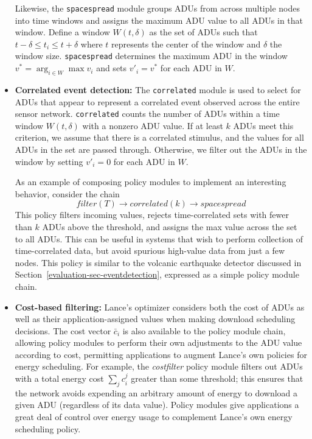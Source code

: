 \begin{itemize}
\hspace{0.25in}
Likewise, the \texttt{spacespread} module groups ADUs from across multiple
nodes into time windows and assigns the maximum ADU value to all ADUs in that
window. Define a window $W(t,\delta)$ as the set of ADUs such that $t-\delta
\leq t_i \leq t+\delta$ where $t$ represents the center of the window and
$\delta$ the window size. \texttt{spacespread} determines the maximum ADU in
the window $v^* = \arg_{i \in W} \max v_i$ and sets $v'_i = v^{*}$ for each
ADU in $W$.

\item \textbf{Correlated event detection:} The \texttt{correlated} module is
used to select for ADUs that appear to represent a correlated event observed
across the entire sensor network. \texttt{correlated} counts the number of
ADUs within a time window $W(t,\delta)$ with a nonzero ADU value. If at least
$k$ ADUs meet this criterion, we assume that there is a correlated stimulus,
and the values for all ADUs in the set are passed through. Otherwise, we
filter out the ADUs in the window by setting $v'_i = 0$ for each ADU in $W$.

\hspace{0.25in} As an example of composing policy modules to implement an
interesting behavior, consider the chain \[
\mathit{filter}(T)\rightarrow\mathit{correlated}(k)\rightarrow\mathit{spacespread}
\] This policy filters incoming values, rejects time-correlated sets with
fewer than $k$ ADUs above the threshold, and assigns the max value across the
set to all ADUs. This can be useful in systems that wish to perform
collection of time-correlated data, but avoid spurious high-value data from
just a few nodes. This policy is similar to the volcanic earthquake detector
discussed in Section~\ref{evaluation-sec-eventdetection}, expressed as a
simple policy module chain.

\item \textbf{Cost-based filtering:} Lance's optimizer considers both the
cost of ADUs as well as their application-assigned values when making
download scheduling decisions. The cost vector $\bar{c}_i$ is also available
to the policy module chain, allowing policy modules to perform their own
adjustments to the ADU value according to cost, permitting applications to
augment Lance's own policies for energy scheduling. For example, the
\textit{costfilter} policy module filters out ADUs with a total energy cost
$\sum_j c_i^j$ greater than some threshold; this ensures that the network
avoids expending an arbitrary amount of energy to download a given ADU
(regardless of its data value). Policy modules give applications a great deal
of control over energy usage to complement Lance's own energy scheduling
policy.


\end{itemize}
